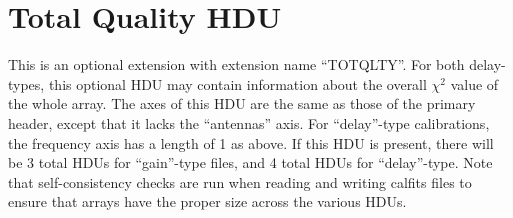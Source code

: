 \documentclass[11pt, oneside, english]{article}   	%
\begin{document}
\section{Total Quality HDU}
This is an optional extension with extension name ``TOTQLTY''.
For both delay-types, this optional HDU may contain information about the overall $\chi^2$ value of the whole array. 
The axes of this HDU are the same as those of the primary header, except that it lacks the ``antennas'' axis.
For ``delay''-type calibrations, the frequency axis has a length of 1 as above. 
If this HDU is present, there will be 3 total HDUs for ``gain''-type files, and 4 total HDUs for ``delay''-type. 
Note that self-consistency checks are run when reading and writing calfits files to ensure that arrays have the proper size across the various HDUs.

\end{document}
